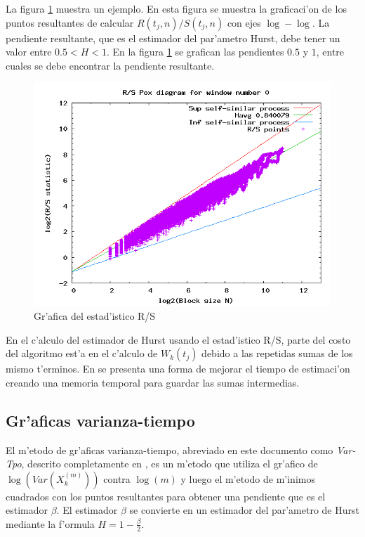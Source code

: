 La figura \ref{fig:poxdiagram} muestra un ejemplo. En esta figura se muestra la
graficaci'on de los puntos resultantes de calcular $R(t_j,n)/S(t_j,n)$ con
ejes $\log - \log$. La pendiente resultante, que es el estimador del par'ametro
Hurst, debe tener un valor entre $0.5 < H < 1$. En la figura 
\ref{fig:poxdiagram} se grafican las pendientes $0.5$ y $1$, entre cuales se
debe encontrar la pendiente resultante.

\begin{figure}[h]
\centering
\includegraphics[scale=0.4,type=png,ext=.png,read=.png]{figures/poxdiagram}
\caption{Gr'afica del estad'istico R/S}
\label{fig:poxdiagram}
\end{figure}

En el c'alculo del estimador de Hurst usando el estad'istico R/S, parte del
costo del algoritmo est'a en el c'alculo de $W_k(t_j)$ debido a las repetidas
sumas de los mismo t'erminos. En \cite{Ryuji_Igarashi2007968} se presenta una
forma de mejorar el tiempo de estimaci'on creando una memoria temporal para 
guardar las sumas intermedias. 

\subsection{Gr'aficas varianza-tiempo} \label{subsect:vartime}

El m'etodo de gr'aficas varianza-tiempo, abreviado en este documento
como {\it Var-Tpo}, descrito completamente en \cite{variance-timeplots}, es un
m'etodo que utiliza el gr'afico de $\log (Var(X_k^{(m)}))$ contra $\log (m)$ y luego el m'etodo de m'inimos cuadrados
con los puntos resultantes para obtener una pendiente que es el estimador
$\beta$. El estimador $\beta$ se convierte en un estimador del par'ametro de 
Hurst mediante la f'ormula $H = 1 - \frac{\beta}{2}$. \\


